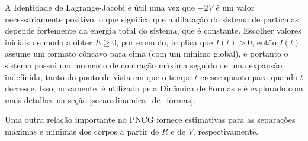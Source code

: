 A Identidade de Lagrange-Jacobi é útil uma vez que $-2V$ é um valor necessariamente positivo, o que significa que a dilatação do sistema de partículas depende fortemente da energia total do sistema, que é constante. Escolher valores iniciais de modo a obter $E \geq 0$, por exemplo, implica que $\ddot I (t) > 0$, então $I(t)$ assume um formato côncavo para cima (com um mínimo global), e portanto o sistema possui um momento de contração máxima seguido de uma expansão indefinida, tanto do ponto de vista em que o tempo $t$ cresce quanto para quando $t$ decresce. Isso, novamente, é utilizado pela Dinâmica de Formas e é explorado com mais detalhes na seção \ref{secao:dinamica_de_formas}.

Uma outra relação importante no PNCG fornece estimativas para as separações máximas e mínimas dos corpos a partir de $R$ e de $V$, respectivamente.

